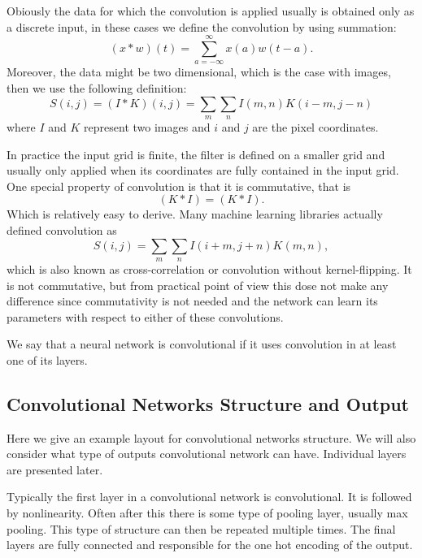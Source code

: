 \documentclass[]{article}
\begin{document}
Obiously the data for which the convolution is applied usually is obtained only
as a discrete input, in these cases we define the convolution by using
summation:
\[
(x * w)(t) = \sum_{a = -\infty}^{\infty} x(a)w(t - a).
\]
Moreover, the data might be two dimensional, which is the case with images, then
we use the following definition:
\[
S(i, j) = (I * K)(i, j) = \sum_m \sum_n I(m , n) K(i - m, j - n)
\]
where $I$ and $K$ represent two images and $i$ and $j$ are the pixel coordinates.

In practice the input grid is finite, the filter is defined on a smaller grid and
usually only applied when its coordinates are fully contained in the input grid.
One special property of convolution is that it is commutative, that is
\[
 (K * I) = (K * I).
\]
Which is relatively easy to derive. Many machine learning libraries actually
defined convolution as
\[
S(i, j) = \sum_m \sum_n I(i + m , j + n) K(m, n),
\]
which is also known as cross-correlation or convolution without kernel-flipping.
It is not commutative, but from practical point of view this dose not make any difference
since commutativity is not needed and the network can learn its parameters with
respect to either of these convolutions.

We say that a neural network is convolutional if it uses convolution in at least
one of its layers.


\subsection{Convolutional Networks Structure and Output}
Here we give an example layout for convolutional networks structure. We will also
consider what type of outputs convolutional network can have. Individual layers are
presented later.

Typically the first layer in a convolutional network is convolutional. It is followed
by nonlinearity. Often after this there is some type of pooling layer, usually max
pooling. This type of structure can then be repeated multiple times. The final layers are
fully connected and responsible for the one hot encoding of the output.
\end{document}
